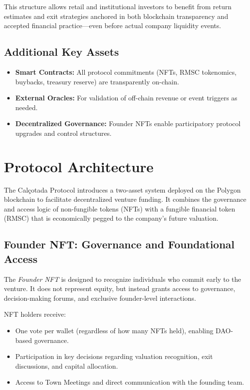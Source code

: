 \documentclass[conference]{IEEEtran}
\begin{document}
This structure allows retail and institutional investors to benefit from return estimates and exit strategies anchored in both blockchain transparency and accepted financial practice—even before actual company liquidity events.

\subsection{Additional Key Assets}
\begin{itemize}
    \item \textbf{Smart Contracts:} All protocol commitments (NFTs, RMSC tokenomics, buybacks, treasury reserve) are transparently on-chain.
    \item \textbf{External Oracles:} For validation of off-chain revenue or event triggers as needed.
    \item \textbf{Decentralized Governance:} Founder NFTs enable participatory protocol upgrades and control structures.
\end{itemize}

\section{Protocol Architecture}


% 

The Calçotada Protocol introduces a two-asset system deployed on the Polygon blockchain to facilitate decentralized venture funding. It combines the governance and access logic of non-fungible tokens (NFTs) with a fungible financial token (RMSC) that is economically pegged to the company’s future valuation.

\subsection{Founder NFT: Governance and Foundational Access}

The \textit{Founder NFT} is designed to recognize individuals who commit early to the venture. It does not represent equity, but instead grants access to governance, decision-making forums, and exclusive founder-level interactions.

NFT holders receive:
\begin{itemize}
    \item One vote per wallet (regardless of how many NFTs held), enabling DAO-based governance.
    \item Participation in key decisions regarding valuation recognition, exit discussions, and capital allocation.
    \item Access to Town Meetings and direct communication with the founding team.
\end{itemize}
\end{document}
